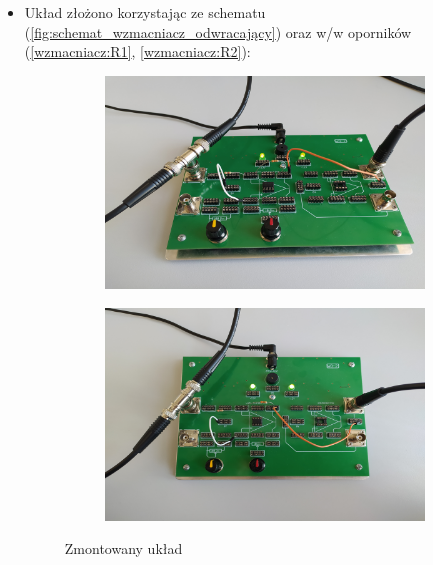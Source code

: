\begin{itemize}
    \item Układ złożono korzystając ze schematu (\ref{fig:schemat_wzmacniacz_odwracający}) oraz w/w oporników (\ref{wzmacniacz:R1}, \ref{wzmacniacz:R2}):
        \begin{figure}[H]
            \centering
            \begin{subfigure}[h]{0.4\textwidth}
                \includegraphics[width=\textwidth]{img/phone/1651502036867_scaled.png}
            \end{subfigure}
            \begin{subfigure}[h]{0.4\textwidth}
                \includegraphics[width=\textwidth]{img/phone/1651502036857_scaled.png}
            \end{subfigure}
            \caption{Zmontowany układ}
            \label{wzmacniacz:zmontowany_uklad}
        \end{figure}
\end{itemize}

